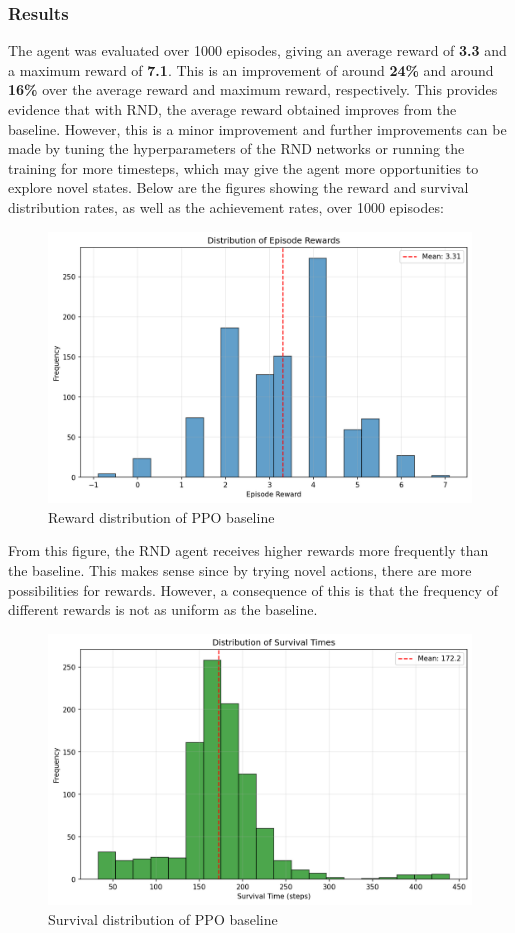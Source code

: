 \documentclass[twocolumn]{article}
\begin{document}
\subsubsection*{Results}
The agent was evaluated over 1000 episodes, giving an average reward of \textbf{3.3} and a maximum reward of \textbf{7.1}. This is an improvement of around \textbf{24\%} and around \textbf{16\%} over the average reward and maximum reward, respectively. This provides evidence that with RND, the average reward obtained improves from the baseline. However, this is a minor improvement and further improvements can be made by tuning the hyperparameters of the RND networks or running the training for more timesteps, which may give the agent more opportunities to explore novel states. Below are the figures showing the reward and survival distribution rates, as well as the achievement rates, over 1000 episodes:
\begin{figure}[H]
    \centering
    \includegraphics[width=0.75\linewidth]{images/reward_distribution_ppo_improv1_1000_episodes.png}
    \caption{Reward distribution of PPO baseline}
    \label{fig:placeholder}
\end{figure}
From this figure, the RND agent receives higher rewards more frequently than the baseline. This makes sense since by trying novel actions, there are more possibilities for rewards. However, a consequence of this is that the frequency of different rewards is not as uniform as the baseline.
\begin{figure}[H]
    \centering
    \includegraphics[width=0.75\linewidth]{images/survival_distribution_ppo_improv1_1000_episodes.png}
    \caption{Survival distribution of PPO baseline}
    \label{fig:placeholder}
\end{figure}
\end{document}

